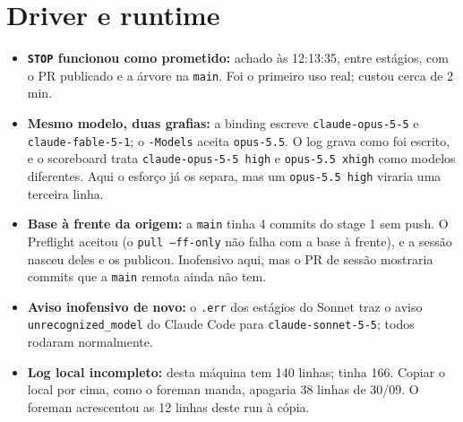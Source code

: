 \documentclass[11pt,a4paper]{article}
\begin{document}
\section{Driver e runtime}
\begin{itemize}
  \item \textbf{\texttt{STOP} funcionou como prometido:} achado às 12:13:35,
        entre estágios, com o PR publicado e a árvore na \texttt{main}. Foi o
        primeiro uso real; custou cerca de 2 min.
  \item \textbf{Mesmo modelo, duas grafias:} a binding escreve
        \texttt{claude-opus-5-5} e \texttt{claude-fable-5-1}; o
        \texttt{-Models} aceita \texttt{opus-5.5}. O log grava como foi
        escrito, e o scoreboard trata \texttt{claude-opus-5-5 high} e
        \texttt{opus-5.5 xhigh} como modelos diferentes. Aqui o esforço já os
        separa, mas um \texttt{opus-5.5 high} viraria uma terceira linha.
  \item \textbf{Base à frente da origem:} a \texttt{main} tinha 4 commits do
        stage 1 sem push. O Preflight aceitou (o \texttt{pull --ff-only} não
        falha com a base à frente), e a sessão nasceu deles e os publicou.
        Inofensivo aqui, mas o PR de sessão mostraria commits que a
        \texttt{main} remota ainda não tem.
  \item \textbf{Aviso inofensivo de novo:} o \texttt{.err} dos estágios do
        Sonnet traz o aviso \texttt{unrecognized\_model} do Claude Code
        para \texttt{claude-sonnet-5-5}; todos rodaram normalmente.
  \item \textbf{Log local incompleto:}  desta máquina
        tem 140 linhas;  tinha 166. Copiar o
        local por cima, como o foreman manda, apagaria 38 linhas de 30/09. O
        foreman acrescentou as 12 linhas deste run à cópia.
\end{itemize}
\end{document}
